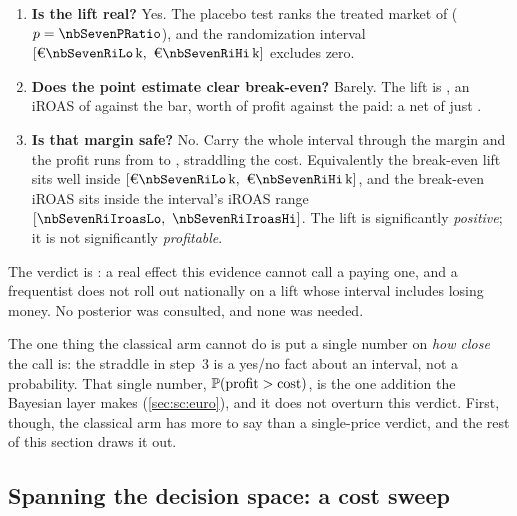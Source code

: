 \begin{enumerate}[leftmargin=*]
  \item \textbf{Is the lift real?} Yes. The placebo test ranks the treated market \nbSevenTreatedRank{}
        of \nbSevenNUnits{} ($p = \nbSevenPRatio$), and the randomization interval
        $[\keur{\nbSevenRiLo},\ \keur{\nbSevenRiHi}]$ excludes zero.
  \item \textbf{Does the point estimate clear break-even?} Barely. The lift is \keur{\nbSevenClTotal},
        an iROAS of \nbSevenIroas{} against the \nbSevenBreakevenIroas{} bar, worth
        \keur{\nbSevenClProfit} of profit against the \keur{\nbSevenCost} paid: a net of just
        \keur{\nbSevenClNet}.
  \item \textbf{Is that margin safe?} No. Carry the whole interval through the margin and the profit
        runs from \keur{\nbSevenClProfitLo} to \keur{\nbSevenClProfitHi}, straddling the
        \keur{\nbSevenCost} cost. Equivalently the break-even lift \keur{\nbSevenBreakevenLift} sits
        well inside $[\keur{\nbSevenRiLo},\ \keur{\nbSevenRiHi}]$, and the break-even iROAS
        \nbSevenBreakevenIroas{} sits inside the interval's iROAS range
        $[\nbSevenRiIroasLo,\ \nbSevenRiIroasHi]$. The lift is significantly \emph{positive}; it is not
        significantly \emph{profitable}.
\end{enumerate}

The verdict is \textbf{\nbSevenDecision}: a real effect this evidence cannot call a paying one, and a
frequentist does not roll out nationally on a lift whose interval includes losing money. No posterior
was consulted, and none was needed.

The one thing the classical arm cannot do is put a single number on \emph{how close} the call is: the
straddle in step~3 is a yes/no fact about an interval, not a probability. That single number,
$\operatorname{\mathbb{P}}(\text{profit} > \text{cost})$, is the one addition the Bayesian layer makes (\cref{sec:sc:euro}),
and it does not overturn this verdict. First, though, the classical arm has more to say than a
single-price verdict, and the rest of this section draws it out.

\subsection*{Spanning the decision space: a cost sweep}


